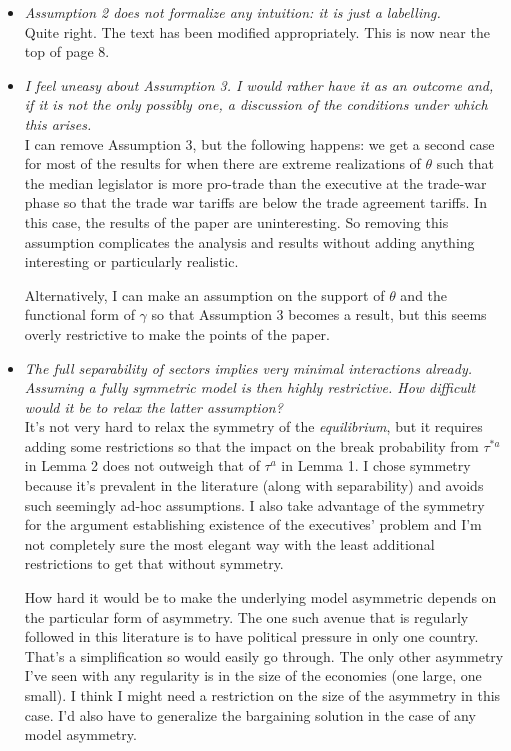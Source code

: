 \documentclass[12pt]{report}
\begin{document}
\begin{itemize}
  \item \textit{Assumption 2 does not formalize any intuition: it is just a labelling.} \\
	Quite right. The text has been modified appropriately. This is now near the top of page 8.
	
  \item \textit{I feel uneasy about Assumption 3. I would rather have it as an outcome and, if it is not the only possibly one, a discussion of the conditions under which this arises.} \\
	I can remove Assumption 3, but the following happens: we get a second case for most of the results for when there are extreme realizations of $\theta$ such that the median legislator is more pro-trade than the executive at the trade-war phase so that the trade war tariffs are below the trade agreement tariffs. In this case, the results of the paper are uninteresting. So removing this assumption complicates the analysis and results without adding anything interesting or particularly realistic.
	
	Alternatively, I can make an assumption on the support of $\theta$ and the functional form of $\gamma$ so that Assumption 3 becomes a result, but this seems overly restrictive to make the points of the paper.
	
  \item \textit{The full separability of sectors implies very minimal interactions already. Assuming a fully symmetric model is then highly restrictive. How difficult would it be to relax the latter assumption?} \\
	It's not very hard to relax the symmetry of the \textit{equilibrium}, but it requires adding some restrictions so that the impact on the break probability from $\tau^{*a}$ in Lemma 2 does not outweigh that of $\tau^a$ in Lemma 1. I chose symmetry because it's prevalent in the literature (along with separability) and avoids such seemingly ad-hoc assumptions. I also take advantage of the symmetry for the argument establishing existence of the executives' problem and I'm not completely sure the most elegant way with the least additional restrictions to get that without symmetry.
	
	How hard it would be to make the underlying model asymmetric depends on the particular form of asymmetry. The one such avenue that is regularly followed in this literature is to have political pressure in only one country. That's a simplification so would easily go through. The only other asymmetry I've seen with any regularity is in the size of the economies (one large, one small). I think I might need a restriction on the size of the asymmetry in this case. I'd also have to generalize the bargaining solution in the case of any model asymmetry.
	

\end{itemize}
\end{document}
